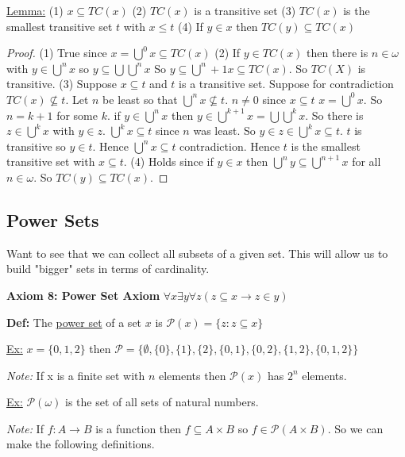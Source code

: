 \documentclass{article}
\newcommand{\set}[1]{\{#1\}}
\begin{document}
    \underline{Lemma:}
    (1) $x \subseteq TC(x)$
    (2) $TC(x)$ is a transitive set
    (3) $TC(x)$ is the smallest transitive set $t$ with $x \leq t$
    (4) If $y \in x$ then $TC(y) \subseteq TC(x)$

    \begin{proof}
    (1) True since $x = \bigcup^0 x \subseteq TC(x)$
    (2) If $y \in TC(x)$ then there is $n \in \omega$ with $y \in \bigcup^n x$ so $y \subseteq \bigcup \bigcup^n x$
        So $y \subseteq \bigcup ^n+1 x \subseteq TC(x)$.
        So $TC(X)$ is transitive.
    (3) Suppose $x \subseteq t$ and $t$ is a transitive set.
        Suppose for contradiction $TC(x) \nsubseteq t$.
        Let $n$ be least so that $\bigcup^n x \nsubseteq t$.
        $n \neq 0$ since $x \subseteq t$ $x=\bigcup^0 x$.
        So $n=k+1$ for some $k$.
        if $y \in \bigcup^n x$ then $y \in \bigcup^{k+1} x = \bigcup \bigcup^k x$.
        So there is $z \in \bigcup^k x$ with $y \in z$.
        $\bigcup^k x \subseteq t$ since $n$ was least.
        So $y \in z \in \bigcup^k x \subseteq t$.
        $t$ is transitive so $y \in t$.
        Hence $\bigcup^n x \subseteq t$ contradiction.
        Hence $t$ is the smallest transitive set with $x \subseteq t$.
    (4) Holds since if $y \in x$ then $\bigcup^n y \subseteq \bigcup^{n+1} x$ for all $n \in \omega$.
        So $TC(y) \subseteq TC(x)$.
    \end{proof}


    \subsection{Power Sets}
    Want to see that we can collect all subsets of a given set.
    This will allow us to build "bigger" sets in terms of cardinality.

    \textbf{Axiom 8: Power Set Axiom}
    $\forall x \exists y \forall z (z \subseteq x \rightarrow z \in y)$

    \textbf{Def:} The \underline{power set} of a set $x$ is $\mathcal{P}(x) = \set{z : z \subseteq x}$

    \underline{Ex:} $x = \set{0,1,2}$ then $\mathcal{P} = \set{\emptyset, \set{0}, \set{1}, \set{2}, \set{0,1}, \set{0,2}, \set{1,2}, \set{0,1,2}}$

    \emph{Note:} If x is a finite set with $n$ elements then $\mathcal{P}(x)$ has $2^n$ elements.

    \underline{Ex:} $\mathcal{P}(\omega)$ is the set of all sets of natural numbers.

    \emph{Note:} If $f : A \rightarrow B$ is a function then $f \subseteq A \times B$ so $f \in \mathcal{P}(A \times B)$.
    So we can make the following definitions.
\end{document}
